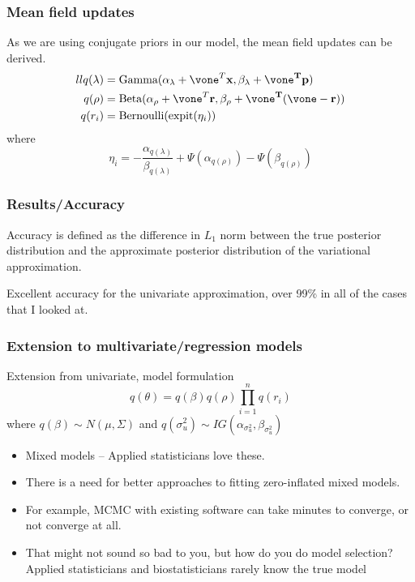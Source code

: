 \documentclass{beamer}
\begin{document}
\begin{frame}
\frametitle{Mean field updates}
As we are using conjugate priors in our model, the mean field updates can be derived.
\begin{align*}{ll}
q(\lambda) &= \text{Gamma}(\alpha_\lambda + \vone^T \vx, \beta_\lambda + \vone^T\vp) \\
q(\rho) &= \text{Beta}(\alpha_\rho + \vone^T\vr, \beta_\rho + \vone^T(\vone - \vr)) \\
q(r_i) &= \text{Bernoulli}(\text{expit}(\eta_i))
\end{align*}
where
$$
\eta_i = - \frac{\alpha_{q(\lambda)}}{\beta_{q(\lambda)}} + \Psi(\alpha_{q(\rho)}) - \Psi(\beta_{q(\rho)})
$$
\end{frame}

\begin{frame}
\frametitle{Results/Accuracy}
Accuracy is defined as the difference in $L_1$ norm between the true posterior distribution and
the approximate posterior distribution of the variational approximation.

Excellent accuracy for the univariate approximation, over 99\% in all of the cases that I looked at.
\end{frame}

\begin{frame}
\frametitle{Extension to multivariate/regression models}
Extension from univariate, model formulation
$$
q(\theta) = q(\beta) q(\rho) \prod_{i=1}^n q(r_i)
$$
where
$q(\beta) \sim N(\mu, \Sigma)$ and
$q(\sigma_u^2) \sim IG(\alpha_{\sigma_u^2}, \beta_{\sigma_u^2})$

\begin{itemize}
\item Mixed models -- Applied statisticians love these.
\item There is a need for better approaches to fitting zero-inflated mixed models.
\item For example, MCMC with existing software can take minutes to
converge, or not converge at all.
\item That might not sound so bad to you, but how do you
do model selection? Applied statisticians and biostatisticians rarely know the true model
\end{itemize}
\end{frame}
\end{document}
